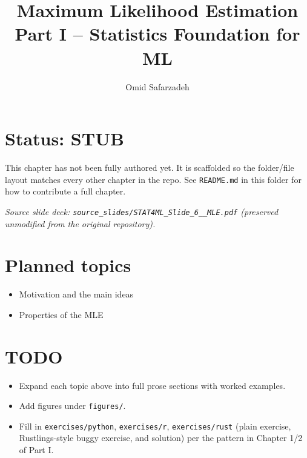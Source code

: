 \documentclass[11pt]{article}
\title{Maximum Likelihood Estimation \\ \large Part I -- Statistics Foundation for ML}
\author{Omid Safarzadeh}
\date{}
\begin{document}
\maketitle

\section*{Status: STUB}
This chapter has not been fully authored yet. It is scaffolded so the
folder/file layout matches every other chapter in the repo. See
\texttt{README.md} in this folder for how to contribute a full chapter.

\textit{Source slide deck: \texttt{source\_slides/STAT4ML\_Slide\_6\_\_MLE.pdf} (preserved unmodified from the original repository).}



\section*{Planned topics}
\begin{itemize}
  \item Motivation and the main ideas
  \item Properties of the MLE
\end{itemize}

\section*{TODO}
\begin{itemize}
  \item Expand each topic above into full prose sections with worked examples.
  \item Add figures under \texttt{figures/}.
  \item Fill in \texttt{exercises/python}, \texttt{exercises/r}, \texttt{exercises/rust}
        (plain exercise, Rustlings-style buggy exercise, and solution) per the
        pattern in Chapter 1/2 of Part I.
\end{itemize}
\end{document}
